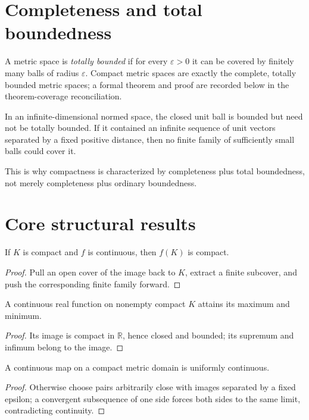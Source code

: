 \section{Completeness and total boundedness}
A metric space is \emph{totally bounded} if for every $\varepsilon>0$ it can be covered by finitely many balls of radius $\varepsilon$. Compact metric spaces are exactly the complete, totally bounded metric spaces; a formal theorem and proof are recorded below in the theorem-coverage reconciliation.


\begin{example}\label{ex:ii06-expand-03}
In an infinite-dimensional normed space, the closed unit ball is bounded but
need not be totally bounded. If it contained an infinite sequence of unit
vectors separated by a fixed positive distance, then no finite family of
sufficiently small balls could cover it.

This is why compactness is characterized by completeness plus total
boundedness, not merely completeness plus ordinary boundedness.
\end{example}
\section{Core structural results}

\begin{theorem}\label{thm:ii06-01}
If $K$ is compact and $f$ is continuous, then $f(K)$ is compact.
\begin{proof}
Pull an open cover of the image back to $K$, extract a finite subcover, and push the corresponding finite family forward.
\end{proof}
\end{theorem}

\begin{theorem}\label{thm:ii06-02}
A continuous real function on nonempty compact $K$ attains its maximum and minimum.
\begin{proof}
Its image is compact in $\mathbb R$, hence closed and bounded; its supremum and infimum belong to the image.
\end{proof}
\end{theorem}

\begin{theorem}\label{thm:ii06-03}
A continuous map on a compact metric domain is uniformly continuous.
\begin{proof}
Otherwise choose pairs arbitrarily close with images separated by a fixed epsilon; a convergent subsequence of one side forces both sides to the same limit, contradicting continuity.
\end{proof}
\end{theorem}

